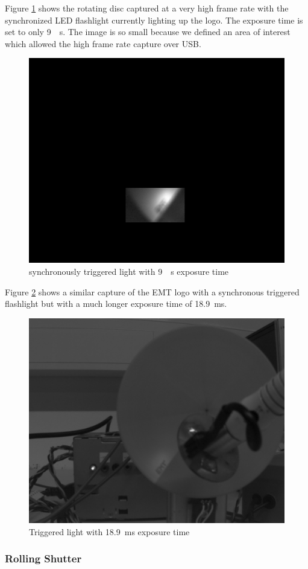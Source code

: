 \documentclass[
a4paper,     %
11pt         %
]{scrartcl}  %
\begin{document}
Figure \ref{fig:triggered_9us} shows the rotating disc captured at a very high frame rate with the synchronized LED flashlight currently lighting up the logo.
The exposure time is set to only \SI{9}{\mu s}.
The image is so small because we defined an area of interest which allowed the high frame rate capture over USB.

\begin{figure}[H]
 \centering
 \includegraphics[width=.6\linewidth]{./Bildg_Messtechnik_Lab/SensorDynamics/triggered_9us.png}
 \caption{synchronously triggered light with \SI{9}{\mu s} exposure time}
 \label{fig:triggered_9us}
\end{figure}

Figure \ref{fig:triggered_light_189ms_exp} shows a similar capture of the EMT logo with a synchronous triggered flashlight but with a much longer exposure time of \SI{18.9}{ms}.

\begin{figure}[H]
 \centering
 \includegraphics[width=.6\linewidth]{./Bildg_Messtechnik_Lab/SensorDynamics/triggered_light_18_9ms_exp.png}
 \caption{Triggered light with \SI{18.9}{ms} exposure time}
 \label{fig:triggered_light_189ms_exp}
\end{figure}

\subsubsection{Rolling Shutter}
\end{document}
